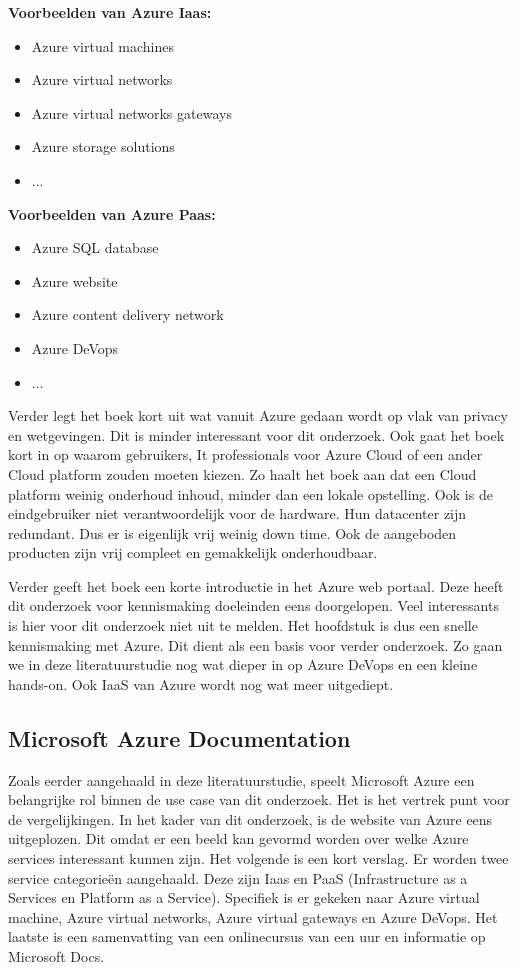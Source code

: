 \textbf{Voorbeelden van Azure Iaas:}
\begin{itemize}
    \item Azure virtual machines
    \item Azure virtual networks
    \item Azure virtual networks gateways
    \item Azure storage solutions
    \item ...
\end{itemize}
\textbf{Voorbeelden van Azure Paas:}
\begin{itemize}
    \item Azure SQL database
    \item Azure website
    \item Azure content delivery network
    \item Azure DeVops
    \item ...
\end{itemize}
Verder legt het boek  \autocite{Copeland2015} kort uit wat vanuit Azure gedaan wordt op vlak van privacy en wetgevingen. Dit is minder interessant voor dit onderzoek. Ook gaat het boek kort in op waarom gebruikers, It professionals voor Azure Cloud of een ander Cloud platform zouden moeten kiezen. Zo haalt het boek  \autocite{Copeland2015} aan dat een Cloud platform weinig onderhoud inhoud, minder dan een lokale opstelling. Ook is de eindgebruiker niet verantwoordelijk voor de hardware. Hun datacenter zijn redundant. Dus er is eigenlijk vrij weinig down time. Ook de aangeboden producten zijn vrij compleet en gemakkelijk onderhoudbaar.

Verder geeft het boek  \autocite{Copeland2015} een korte introductie in het Azure web portaal. Deze heeft dit onderzoek voor kennismaking doeleinden eens doorgelopen. Veel interessants is hier voor dit onderzoek niet uit te melden. Het hoofdstuk is dus een snelle kennismaking met Azure. Dit dient als een basis voor verder onderzoek. Zo gaan we in deze literatuurstudie nog wat dieper in op Azure DeVops en een kleine hands-on. Ook IaaS van Azure wordt nog wat meer uitgediept.

\subsection{Microsoft Azure Documentation}
Zoals eerder aangehaald in deze literatuurstudie, speelt Microsoft Azure een belangrijke rol binnen de use case van dit onderzoek. Het is het vertrek punt voor de vergelijkingen. In het kader van dit onderzoek, is de website van Azure eens uitgeplozen. Dit omdat er een beeld kan gevormd worden over welke Azure services interessant kunnen zijn. Het volgende is een kort verslag. Er worden twee service categorieën aangehaald. Deze zijn Iaas en PaaS (Infrastructure as a Services en Platform as a Service). Specifiek is er gekeken naar Azure virtual machine, Azure virtual networks, Azure virtual gateways en Azure DeVops. Het laatste is een samenvatting van een onlinecursus van een uur en informatie op Microsoft Docs.


